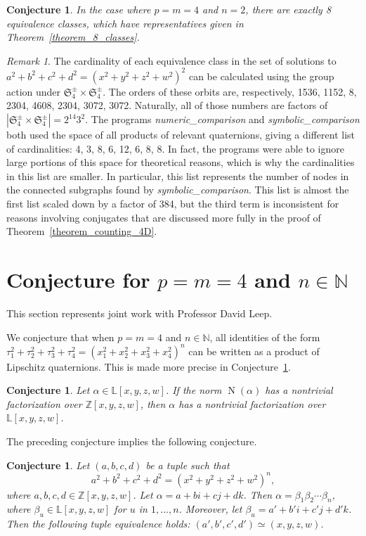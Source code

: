 \documentclass[12pt,table]{article}
\newtheorem{conjecture}[theorem]{Conjecture}
\theoremstyle{definition}
\theoremstyle{remark}
\newtheorem{remark}[theorem]{Remark}
\newcommand{\Nnn}{\mathbb N}
\newcommand{\Zzz}{\mathbb Z}
\newcommand{\Lll}{\mathbb L}
\numberwithin{equation}{section}
\DeclareMathOperator{\N}{N}
\begin{document}
\begin{conjecture}
In the case where  $p = m = 4$ and $n = 2$,
there are exactly 8 equivalence classes, which have representatives
given in Theorem~\ref{theorem_8_classes}.
\end{conjecture}

\begin{remark}
The cardinality of each equivalence class in the
set of solutions to $a^2 + b^2 + c^2 + d^2 = (x^2 + y^2 + z^2 + w^2)^2$
can be calculated using the group action under
$ \mathfrak{S}_4^\pm \times \mathfrak{S}_4^\pm $.
The orders of these orbits are, respectively,
1536, 1152, 8, 2304, 4608, 2304, 3072, 3072.
Naturally, all of those numbers are factors of
$ | \mathfrak{S}_4^\pm \times \mathfrak{S}_4^\pm | = 2^{14} 3^2 $.
The programs \emph{numeric\_comparison} and \emph{symbolic\_comparison} 
both used the space of all products of relevant quaternions,
giving a different list of cardinalities:
4, 3, 8, 6, 12, 6, 8, 8.
In fact, the programs were able to ignore large
portions of this space for theoretical reasons,
which is why the cardinalities in this list are
smaller.
In particular, this list represents the number of
nodes in the connected subgraphs found by  \emph{symbolic\_comparison}.
This list is almost the first list
scaled down by a factor of 384, but the third term is inconsistent
for reasons involving conjugates that are discussed more fully in
the proof of Theorem~\ref{theorem_counting_4D}.
\end{remark}

\section{Conjecture for $p = m = 4$ and $ n \in \Nnn $}
This section represents joint work with Professor David Leep.

We conjecture that when $p = m = 4$ and $ n \in \Nnn $,
all identities of the form
$
\tau_1 ^ 2  + \tau_2 ^ 2  + \tau_3 ^ 2  + \tau_4 ^ 2  
= 
\left(  x_1 ^ 2 + x_2 ^ 2 + x_3 ^ 2 + x_4 ^ 2
\right) ^ n 
$
can be written as
a product of Lipschitz quaternions.
This is made more precise in
Conjecture~\ref{conjecture_Ehrenborg-Leep}.

\begin{conjecture}
Let $ \alpha \in \Lll[x,y,z,w] $.
If the norm $ \N(\alpha) $ has a nontrivial
factorization over $ \Zzz[x,y,z,w] $,
then $ \alpha $ has a nontrivial
factorization over $ \Lll[x,y,z,w] $.
\end{conjecture}
The preceding conjecture implies the following conjecture.
\begin{conjecture}
\label{conjecture_Ehrenborg-Leep}
Let $ (a, b, c, d) $ be a tuple such that
\[
a^2 + b^2 + c^2 + d^2 = (x^2 + y^2 + z^2 + w^2)^n,
\] 
where $ a, b, c, d \in \Zzz[x,y,z,w]$.
Let $\alpha = a + bi + cj + dk $.
Then $ \alpha = \beta_1 \beta_2 \cdots \beta_n $,
where $ \beta_u \in \Lll[x,y,z,w] $ for $u$ in $1, \ldots, n$.
Moreover, let $ \beta_u = a' + b'i + c'j + d'k $. Then
the following tuple equivalence holds: $ (a', b', c', d') \simeq (x, y, z, w) $.
\end{conjecture}
\end{document}
